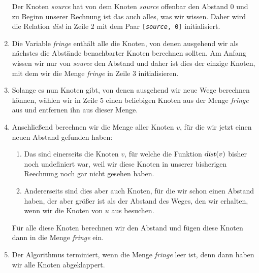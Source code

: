 \begin{enumerate}
      Der Knoten \textsl{source} hat von dem Knoten \textsl{source} offenbar den Abstand $0$
      und zu Beginn unserer Rechnung ist das auch alles, was wir wissen.  Daher wird die Relation
      \textsl{dist} in Zeile 2 mit dem Paar \texttt{[\textsl{source}, 0]} initialisiert.
\item Die Variable \textsl{fringe} enth\"alt alle die Knoten, von denen ausgehend wir als n\"achstes die
      Abst\"ande benachbarter Knoten berechnen sollten.  Am Anfang wissen wir nur von \textsl{source}
      den Abstand und daher ist dies der einzige Knoten, mit dem wir die Menge \textsl{fringe} 
      in Zeile 3 initialisieren.
\item Solange es nun Knoten gibt, von denen ausgehend wir neue Wege berechnen k\"onnen,
      w\"ahlen wir in Zeile 5 einen beliebigen Knoten aus der Menge \textsl{fringe} aus
      und entfernen ihn aus dieser Menge.  
\item Anschlie\ss{}end berechnen wir die Menge aller Knoten $v$, f\"ur die wir jetzt einen neuen
      Abstand gefunden haben:
      \begin{enumerate}
      \item Das sind einerseits die Knoten $v$, f\"ur welche die Funktion $\textsl{dist}(v)$ bisher noch
            undefiniert war, weil wir diese Knoten in unserer bisherigen Reechnung noch gar nicht gesehen
            haben.
      \item Andererseits sind dies aber auch Knoten, f\"ur die wir schon einen Abstand haben, der aber
            gr\"o\ss{}er ist als der Abstand des Weges, den wir erhalten, wenn wir die Knoten von $u$ aus
            besuchen. 
      \end{enumerate}
      F\"ur alle diese Knoten berechnen wir den Abstand und f\"ugen diese Knoten dann in die Menge 
      \textsl{fringe} ein.
\item Der Algorithmus terminiert, wenn die Menge \textsl{fringe} leer ist, denn dann haben wir alle
      Knoten abgeklappert.
\end{enumerate}

